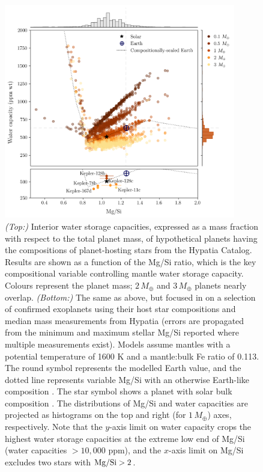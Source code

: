 \documentclass[fleqn,usenatbib]{mnras}
\begin{document}
\begin{figure}
    \centering
    \includegraphics[width=0.9\textwidth]{mgsi_c_h2o_exo_r2.png}
    \caption{\textit{(Top:)} Interior water storage capacities, expressed as a mass fraction with respect to the total planet mass, of hypothetical planets having the compositions of planet-hosting stars from the Hypatia Catalog. Results are shown as a function of the Mg/Si ratio, which is the key compositional variable controlling mantle water storage capacity. Colours represent the planet mass; $2\,M_\oplus$ and $3\,M_\oplus$ planets nearly overlap. \textit{(Bottom:)} The same as above, but focused in on a selection of confirmed exoplanets using their host star compositions and median mass measurements from Hypatia (errors are propagated from the minimum and maximum stellar Mg/Si reported where multiple measurements exist). Models assume mantles with a potential temperature of 1600 K and a mantle:bulk Fe ratio of 0.113. The round symbol represents the modelled Earth value, and the dotted line represents variable Mg/Si with an otherwise Earth-like composition \citep{mcdonough_composition_1995}. The star symbol shows a planet with solar bulk composition \citep{lodders_abundances_2009}. The distributions of Mg/Si and water capacities are projected as histograms on the top and right (for $1\,M_\oplus$) axes, respectively. Note that the $y$-axis limit on water capacity crops the highest water storage capacities at the extreme low end of Mg/Si (water capacities $> 10,000$ ppm), and the $x$-axis limit on Mg/Si excludes two stars with ${\rm Mg/Si }>2$.}
    \label{fig:h2o_mgsi_scatter}
\end{figure}
\end{document}
